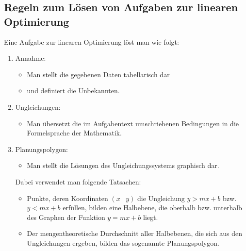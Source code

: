 \documentclass[%
11pt,%
twoside,%
titlepage,%
swissgerman,%
headsepline%
]{scrartcl}
\theoremstyle{definition}
\theoremstyle{plain}
\begin{document}
\subsection{Regeln zum Lösen von Aufgaben zur linearen Optimierung}
Eine Aufgabe zur linearen Optimierung löst man wie folgt:

\begin{enumerate}
  \item Annahme:
  \begin{itemize}
    \item Man stellt die gegebenen Daten tabellarisch dar
    \item und definiert die Unbekannten.
  \end{itemize}
  \item Ungleichungen:
  \begin{itemize}
    \item Man übersetzt die im Aufgabentext umschriebenen
    Bedingungen in die Formelsprache der Mathematik.
  \end{itemize}
  \item Planungspolygon:
  \begin{itemize}
    \item Man stellt die Lösungen des Ungleichungssystems graphisch
    dar.
  \end{itemize}
  Dabei verwendet man folgende Tatsachen:
  \begin{itemize}
    \item Punkte, deren Koordinaten $(x\mid y)$ die Ungleichung $y>mx+b$
    bzw. $y<mx+b$ erfüllen, bilden eine Halbebene, die oberhalb bzw.
    unterhalb des Graphen der Funktion $y=mx+b$ liegt.
    \item Der mengentheoretische Durchschnitt aller Halbebenen, die
    sich aus den Ungleichungen ergeben, bilden das sogenannte
    Planungspolygon.
  \end{itemize}
  

\end{enumerate}
\end{document}
